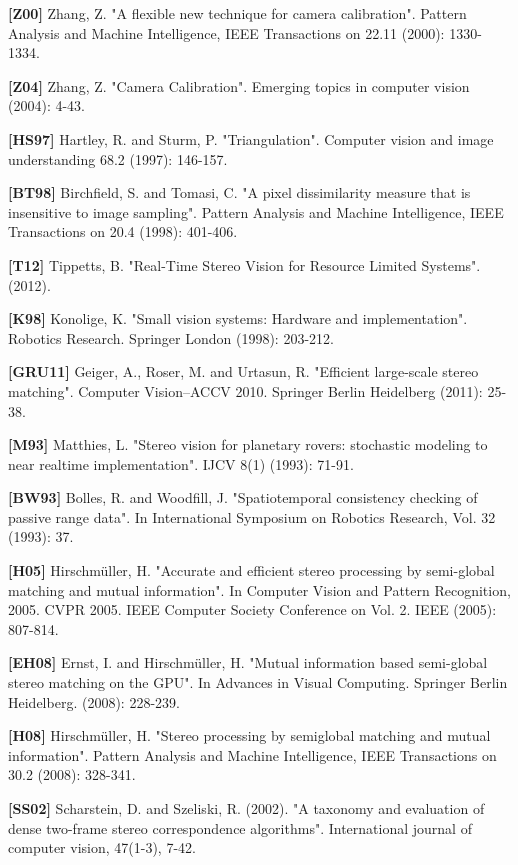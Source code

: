 \documentclass[11pt,a4paper,titlepage]{article}
\begin{document}
\textbf{[Z00]} Zhang, Z. "A flexible new technique for camera calibration". Pattern Analysis and Machine Intelligence, IEEE Transactions on 22.11 (2000): 1330-1334.

\textbf{[Z04]} Zhang, Z. "Camera Calibration". Emerging topics in computer vision (2004): 4-43.

\textbf{[HS97]} Hartley, R. and Sturm, P. "Triangulation". Computer vision and image understanding 68.2 (1997): 146-157.

\textbf{[BT98]} Birchfield, S. and Tomasi, C. "A pixel dissimilarity measure that is insensitive to image sampling". Pattern Analysis and Machine Intelligence, IEEE Transactions on 20.4 (1998): 401-406.

\textbf{[T12]} Tippetts, B. "Real-Time Stereo Vision for Resource Limited Systems". (2012).

\textbf{[K98]} Konolige, K. "Small vision systems: Hardware and implementation". Robotics Research. Springer London (1998): 203-212.

\textbf{[GRU11]} Geiger, A., Roser, M. and Urtasun, R. "Efficient large-scale stereo matching". Computer Vision–ACCV 2010. Springer Berlin Heidelberg (2011): 25-38.

\textbf{[M93]} Matthies, L. "Stereo vision for planetary rovers: stochastic modeling to near realtime implementation". IJCV 8(1) (1993): 71-91.

\textbf{[BW93]} Bolles, R. and Woodfill, J. "Spatiotemporal consistency checking of passive range data". In International Symposium on Robotics Research, Vol. 32 (1993): 37.

\textbf{[H05]} Hirschmüller, H. "Accurate and efficient stereo processing by semi-global matching and mutual information". In Computer Vision and Pattern Recognition, 2005. CVPR 2005. IEEE Computer Society Conference on Vol. 2. IEEE (2005): 807-814.

\textbf{[EH08]} Ernst, I. and Hirschmüller, H. "Mutual information based semi-global stereo matching on the GPU". In Advances in Visual Computing. Springer Berlin Heidelberg. (2008): 228-239.

\textbf{[H08]} Hirschmüller, H. "Stereo processing by semiglobal matching and mutual information". Pattern Analysis and Machine Intelligence, IEEE Transactions on 30.2 (2008): 328-341.

\textbf{[SS02]} Scharstein, D. and Szeliski, R. (2002). "A taxonomy and evaluation of dense two-frame stereo correspondence algorithms". International journal of computer vision, 47(1-3), 7-42.
\end{document}
